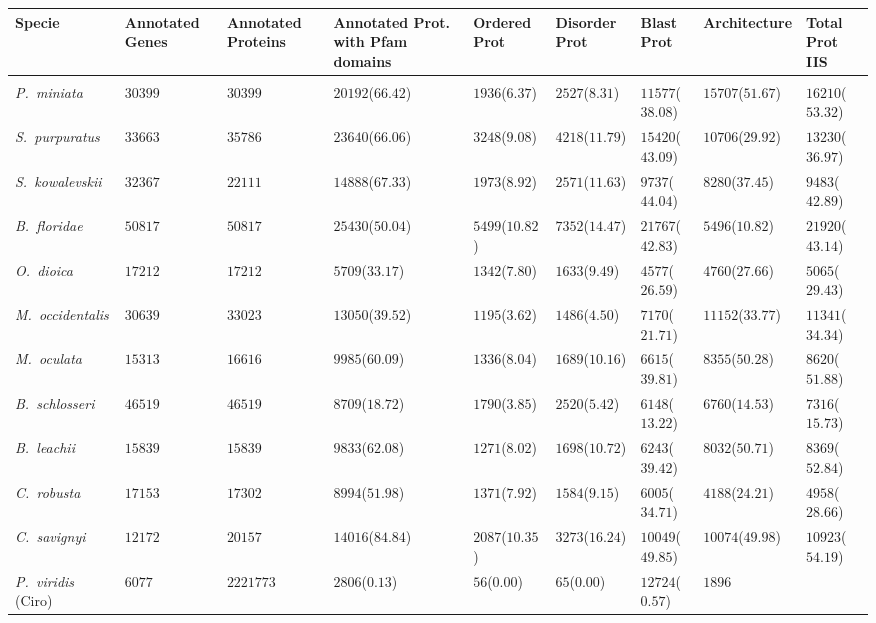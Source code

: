 \documentclass[11pt]{article}
\begin{document}
\begin{table}
\small
\centering
\begin{tabular}{p{3.2cm}p{2cm}p{2cm}p{2cm}p{2cm}p{2cm}p{2cm}p{2.7cm}p{2.6cm}}
\toprule
\textbf{Specie}&\textbf{Annotated Genes}&\textbf{Annotated 
Proteins}&\textbf{Annotated Prot. with Pfam domains}&\textbf{Ordered 
Prot}&\textbf{Disorder Prot}&\textbf{Blast 
Prot}&\textbf{Architecture}&\textbf{Total Prot IIS} \\ 
\midrule \\
\textsl{P.\ miniata}&    
$30399$&$30399$&$20192$($66.42$)&$1936$($6.37$)&$2527$($8.31$)&$11577$($38.08$)&
$15707$($51.67$)&$16210$($53.32$)\\
\textsl{S.\ purpuratus}& 
$33663$&$35786$&$23640$($66.06$)&$3248$($9.08$)&$4218$($11.79$)&$15420$($43.09$)
&$10706$($29.92$)&$13230$($36.97$)\\
\textsl{S.\ kowalevskii}&        
$32367$&$22111$&$14888$($67.33$)&$1973$($8.92$)&$2571$($11.63$)&$9737$($44.04$)&
$8280$($37.45$)&$9483$($42.89$)\\
\midrule
\textsl{B.\ floridae}&   
$50817$&$50817$&$25430$($50.04$)&$5499$($10.82$)&$7352$($14.47$)&$21767$($
42.83$)&$5496$($10.82$)&$21920$($43.14$)\\
\midrule
\textsl{O.\ dioica}
&$17212$&$17212$&$5709$($33.17$)&$1342$($7.80$)&$1633$($9.49$)&$4577$($26.5
9$)&$4760$($27.66$)&$5065$($29.43$)\\
\textsl{M.\ occidentalis}&       
$30639$&$33023$&$13050$($39.52$)&$1195$($3.62$)&$1486$($4.50$)&$7170$($21.71$)&$
11152$($33.77$)&$11341$($34.34$)\\
\textsl{M.\ oculata}&    
$15313$&$16616$&$9985$($60.09$)&$1336$($8.04$)&$1689$($10.16$)&$6615$($39.81$)&$
8355$($50.28$)&$8620$($51.88$)\\
\textsl{B.\ schlosseri}& 
$46519$&$46519$&$8709$($18.72$)&$1790$($3.85$)&$2520$($5.42$)&$6148$($13.2
2$)&$6760$($14.53$)&$7316$($15.73$)\\
\textsl{B.\ leachii }&   
$15839$&$15839$&$9833$($62.08$)&$1271$($8.02$)&$1698$($10.72$)&$6243$($39.42$)&$
8032$($50.71$)&$8369$($52.84$)\\
\textsl{C.\ robusta} 
&$17153$&$17302$&$8994$($51.98$)&$1371$($7.92$)&$1584$($9.15$)&$6005$($34.71$)&$
4188$($24.21$)&$4958$($28.66$)\\
\textsl{C.\ savignyi}&
$12172$&$20157$&$14016$($84.84$)&$2087$($10.35$)&$3273$($16.24$)&$10049$($
49.85$)&$10074$($49.98$)&$10923$($54.19$)\\
\textsl{P.\ viridis} (Ciro)&     
$6077$&$2221773$&$2806$($0.13$)&$56$($0.00$)&$65$($0.00$)&$12724$($0.57$)&$1896$

\end{tabular}
\end{table}
\end{document}
